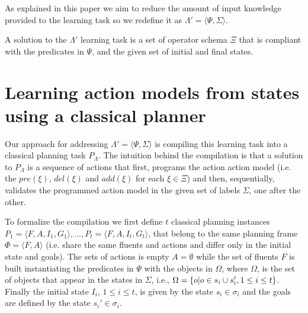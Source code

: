 \documentclass[letterpaper]{article} %
\newcommand{\tup}[1]{{\langle #1 \rangle}}
\begin{document}
As explained in this paper we aim to reduce the amount of input knowledge provided to the learning task so we redefine it as $\Lambda'=\tup{\Psi,\Sigma}$.

A solution to the $\Lambda'$ learning task is a set of operator schema $\Xi$ that is compliant with the predicates in $\Psi$, and the given set of initial and final states.


\section{Learning action models from states using a classical planner}
Our approach for addressing $\Lambda'=\tup{\Psi,\Sigma}$ is compiling this learning task into a classical planning task $P_{\Lambda}$. The intuition behind the compilation is that a solution to $P_{\Lambda}$ is a sequence of actions that first, programs the action action model (i.e. the $pre(\xi)$, $del(\xi)$ and $add(\xi)$ for each $\xi\in\Xi$) and then, sequentially, validates the programmed action model in the given set of labels $\Sigma$, one after the other.

To formalize the compilation we first define $t$ classical planning instances $P_1=\tup{F,A,I_1,G_1},\ldots,P_t=\tup{F,A,I_t,G_t}$, that belong to the same planning frame $\Phi=\tup{F,A}$ (i.e. share the same fluents and actions and differ only in the initial state and goals). The sets of actions is empty $A=\emptyset$ while the set of fluents $F$ is built instantiating the predicates in $\Psi$ with the objects in $\Omega$, where $\Omega$, is the set of objects that appear in the states in $\Sigma$, i.e., $\Omega=\{o|o\in s_i\cup s_i', {\small 1\leq i\leq t}\}$. Finally the initial state $I_i$, {\small $1\leq i\leq t$}, is given by the state $s_i\in \sigma_i$ and the goals are defined by the state $s_i'\in \sigma_i$. 
\end{document}

